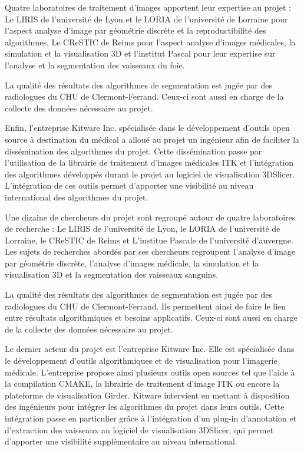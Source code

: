 Quatre laboratoires de traitement d'images apportent leur expertise au projet : Le LIRIS de l'université de Lyon et le LORIA de l'université de Lorraine pour l'aspect analyse d'image par géométrie discrète et la reproductibilité des algorithmes, Le CReSTIC de Reims pour l'aspect analyse d'images médicales, la simulation et la visualisation 3D et l'institut Pascal pour leur expertise sur l'analyse et la segmentation des vaisseaux du foie.

La qualité des résultats des algorithmes de segmentation est jugée par des radiologues du CHU de Clermont-Ferrand. Ceux-ci sont aussi en charge de la collecte des données nécessaire au projet.

Enfin, l'entreprise Kitware Inc. spécialisée dans le développement d'outils open source à destination du médical a alloué au projet un ingénieur afin de faciliter la dissémination des algorithmes du projet. Cette dissémination passe par l'utilisation de la librairie de traitement d'images médicales ITK et l'intégration des algorithmes développés durant le projet au logiciel de visualisation 3DSlicer. L'intégration de ces outils permet d'apporter une visibilité au  niveau international des algorithmes du projet.


Une dizaine de chercheurs du projet sont regroupé autour de quatre laboratoires de recherche : Le LIRIS de l'université de Lyon, le LORIA de l'université de Lorraine, le CReSTIC de Reims et L'institue Pascale de l'université d'auvergne. Les sujets de recherches abordés par ses chercheurs regroupent l'analyse d'image par géométrie discrète, l'analyse d'images médicale, la simulation et la visualisation 3D et la segmentation des vaisseaux sanguins.

La qualité des résultats des algorithmes de segmentation est jugée par des radiologues du CHU de Clermont-Ferrand. Ils permettent ainsi de faire le lien entre résultats algorithmiques et besoins applicatifs. Ceux-ci sont aussi en charge de la collecte des données nécessaire au projet.

Le dernier acteur du projet est l'entreprise Kitware Inc. Elle est spécialisée dans le développement d'outils algorithmiques et de visualisation pour l'imagerie médicale. L'entreprise propose ainsi plusieurs outils open sources tel que l'aide à la compilation CMAKE, la librairie de traitement d'image ITK ou encore la plateforme de visualisation Girder. Kitware intervient en mettant à disposition des ingénieurs pour intégrer les algorithmes du projet dans leurs outils. Cette intégration passe en particulier grâce à l'intégration d'un plug-in d'annotation et d'extraction des vaisseaux au logiciel de visualisation 3DSlicer, qui permet d'apporter une visibilité supplémentaire au niveau international.


